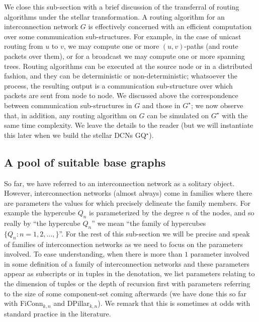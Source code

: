 \documentclass[]{amsart}
\begin{document}
We close this sub-section with a brief discussion of the transferral of routing algorithms under the stellar transformation. A routing algorithm for an interconnection network $G$ is effectively
concerned with an efficient computation over some communication
sub-structures.  For example, in the case of unicast routing from $u$ to $v$, we may
compute one or more $(u,v)$-paths (and route packets over them), or
for a broadcast we may compute one or more spanning trees.  Routing algorithms can be executed at the source
node or in a distributed fashion, and they can be deterministic or
non-deterministic; whatsoever the process, the resulting output is a
communication sub-structure over which packets are sent from node to node.  We discussed above the correspondence between
communication sub-structures in $G$ and those in $G^\star$; we
now observe that, in addition, any routing algorithm on $G$ can be
simulated on $G^\star$ with the same time complexity.  We leave the
details to the reader (but we will instantiate this later when we build the stellar DCNs GQ$^\star$).

\subsection{A pool of suitable base graphs}
\label{sec:suited}

So far, we have referred to an interconnection network as a solitary object. However, interconnection networks (almost always) come in families where there are parameters the values for which precisely delineate the family members. For example the hypercube $Q_n$ is parameterized by the degree $n$ of the nodes, and so really by ``the hypercube $Q_n$'' we mean ``the family of hypercubes $\{Q_n:n=1,2,\ldots,\}$''. For the rest of this sub-section we will be precise and speak of families of interconnection networks as we need to focus on the parameters involved. To ease understanding, when there is more than $1$ parameter involved in some definition of a family of interconnection networks and these parameters appear as subscripts or in tuples in the denotation, we list parameters relating to the dimension of tuples or the depth of recursion first with parameters referring to the size of some component-set coming afterwards (we have done this so far with FiConn$_{k,n}$ and DPillar$_{k,n}$). We remark that this is sometimes at odds with standard practice in the literature. 
\end{document}
